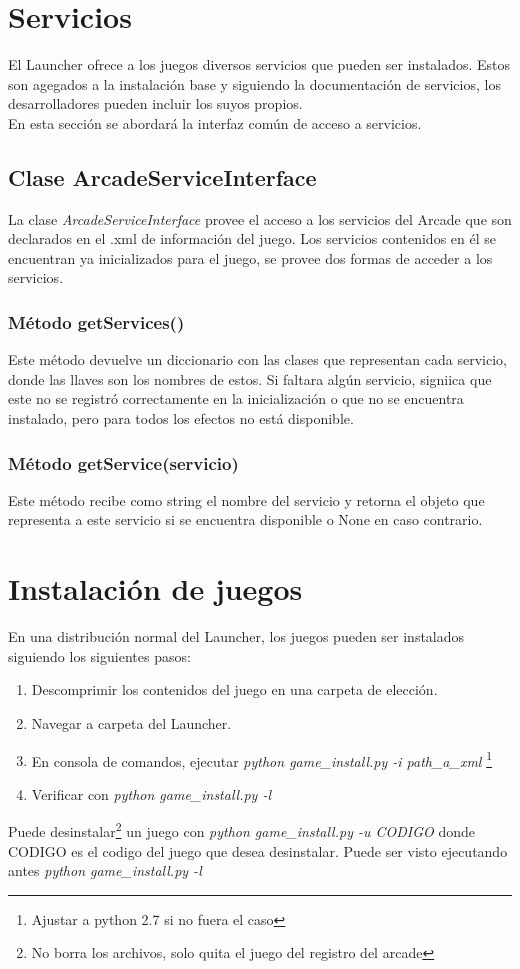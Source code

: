 \documentclass[language=spanish]{article}
\begin{document}
\section{Servicios}

El Launcher ofrece a los juegos diversos servicios que pueden ser instalados. Estos son agegados a la instalación base y siguiendo la documentación de servicios, los desarrolladores pueden incluir los suyos propios.\\
En esta sección se abordará la interfaz común de acceso a servicios.

\subsection{Clase ArcadeServiceInterface}

La clase {\em ArcadeServiceInterface} provee el acceso a los servicios del Arcade que son declarados en el .xml de información del juego. Los servicios contenidos en él se encuentran ya inicializados para el juego, se provee dos formas de acceder a los servicios.

\subsubsection{Método getServices()}

Este método devuelve un diccionario con las clases que representan cada servicio, donde las llaves son los nombres de estos. Si faltara algún servicio, signiica que este no se registró correctamente en la inicialización o que no se encuentra instalado, pero para todos los efectos no está disponible.

\subsubsection{Método getService(servicio)}

Este método recibe como string el nombre del servicio y retorna  el objeto que representa a este servicio si se encuentra disponible o None en caso contrario.

\section{Instalación de juegos}

En una distribución normal del Launcher, los juegos pueden ser instalados siguiendo los siguientes pasos:\\
\begin{enumerate}
	\item Descomprimir los contenidos del juego en una carpeta de elección.
	\item Navegar a carpeta del Launcher.
	\item En consola de comandos, ejecutar {\em python game\_install.py -i path\_a\_xml} \footnote{Ajustar a python 2.7 si no fuera el caso}
	\item Verificar con {\em python game\_install.py -l}
\end{enumerate}
Puede desinstalar\footnote{No borra los archivos, solo quita el juego del registro del arcade} un juego con {\em python game\_install.py -u CODIGO} donde CODIGO es el codigo del juego que desea desinstalar. Puede ser visto ejecutando antes {\em python game\_install.py -l}
\end{document}

